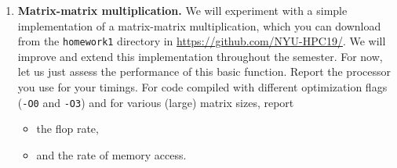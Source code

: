 \documentclass[11pt]{article}
\begin{document}
\begin{enumerate}
\item {\bf Matrix-matrix multiplication.}  We will experiment with a
  simple implementation of a matrix-matrix multiplication, which you
  can download from the \texttt{homework1} directory in
  \url{https://github.com/NYU-HPC19/}. We will improve and extend this
  implementation throughout the semester. For now, let us just assess
  the performance of this basic function. Report the processor you use
  for your timings. For code compiled with different optimization
  flags (\texttt{-O0} and \texttt{-O3}) and for various (large) matrix
  sizes, report
  \begin{itemize}
  \item the flop rate,
  \item and the rate of memory access.
  \end{itemize}
  


\end{enumerate}
\end{document}
